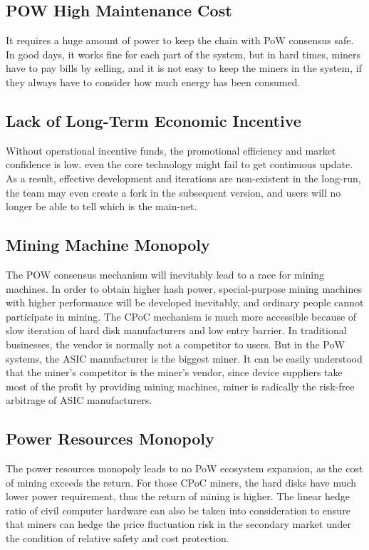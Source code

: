 \subsection{POW High Maintenance Cost}
\begin{flushleft}
    It requires a huge amount of power to keep the chain with PoW consensus safe. In good days, it works fine for each part of the system, but in hard times, miners have to pay bills by selling, and it is not easy to keep the miners in the system, if they always have to consider how much energy has been consumed.
\end{flushleft}
\subsection{Lack of Long-Term Economic Incentive}
\begin{flushleft}
    Without operational incentive funds, the promotional efficiency and market confidence is low. even the core technology might fail to get continuous update. As a result, effective development and iterations are non-existent in the long-run, the team may even create a fork in the subsequent version, and users will no longer be able to tell which is the main-net.
\end{flushleft}
\subsection{Mining Machine Monopoly}
\begin{flushleft}
    The POW consensus mechanism will inevitably lead to a race for mining machines. In order to obtain higher hash power, special-purpose mining machines with higher performance will be developed inevitably, and ordinary people cannot participate in mining. The CPoC mechanism is much more accessible because of slow iteration of hard disk manufacturers and low entry barrier. In traditional businesses, the vendor is normally not a competitor to users. But in the PoW systems, the ASIC manufacturer is the biggest miner. It can be easily understood that the miner's competitor is the miner's vendor, since device suppliers take most of the profit by providing mining machines, miner is radically the risk-free arbitrage of ASIC manufacturers.
\end{flushleft}
\subsection{Power Resources Monopoly}
\begin{flushleft}
    The power resources monopoly leads to no PoW ecosystem expansion, as the cost of mining exceeds the return. For those CPoC miners, the hard disks have much lower power requirement, thus the return of mining is higher. The linear hedge ratio of civil computer hardware can also be taken into consideration to ensure that miners can hedge the price fluctuation risk in the secondary market under the condition of relative safety and cost protection.
\end{flushleft}
